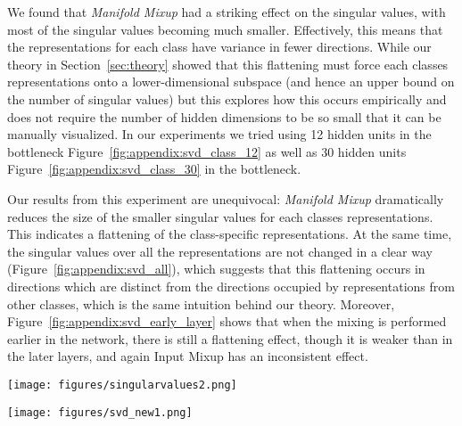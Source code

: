 \documentclass{article} \usepackage[preprint]{nips_2018}
\newcommand{\manifoldmixup}{\textit{Manifold Mixup}}
\begin{document}
{We found that \manifoldmixup{} had a striking effect on the singular values, with most of the singular values becoming much smaller.  Effectively, this means that the representations for each class have variance in fewer directions.  While our theory in Section~\ref{sec:theory} showed that this flattening must force each classes representations onto a lower-dimensional subspace (and hence an upper bound on the number of singular values) but this explores how this occurs empirically and does not require the number of hidden dimensions to be so small that it can be manually visualized.  In our experiments we tried using 12 hidden units in the bottleneck Figure~\ref{fig:appendix:svd_class_12} as well as 30 hidden units Figure~\ref{fig:appendix:svd_class_30} in the bottleneck.  

Our results from this experiment are unequivocal: \manifoldmixup{} dramatically reduces the size of the smaller singular values for each classes representations.  This indicates a flattening of the class-specific representations.  At the same time, the singular values over all the representations are not changed in a clear way (Figure~\ref{fig:appendix:svd_all}), which suggests that this flattening occurs in directions which are distinct from the directions occupied by representations from other classes, which is the same intuition behind our theory.  Moreover, Figure~\ref{fig:appendix:svd_early_layer} shows that when the mixing is performed earlier in the network, there is still a flattening effect, though it is weaker than in the later layers, and again Input Mixup has an inconsistent effect.  

\begin{figure*}
  \centering
  \texttt{[image: figures/singularvalues2.png]}
  \caption{SVD on the class-specific representations in a bottleneck layer with 12 units following 3 hidden layers.  For the first singular value, the value (averaged across the plots) is 50.08 for the baseline, 37.17 for Input Mixup, and 43.44 for \manifoldmixup{} (these are the values at x=0 which are cutoff).  We can see that the class-specific SVD leads to singular values which are dramatically more concentrated when using \manifoldmixup{} with Input Mixup not having a consistent effect.  }
  \label{fig:appendix:svd_class_12}
\end{figure*}

\begin{figure*}
  \centering
  \texttt{[image: figures/svd\_new1.png]}
  \caption{SVD on the class-specific representations in a bottleneck layer with 30 units following 3 hidden layers.  For the first singular value, the value (averaged across the plots) is 14.68 for the baseline, 12.49 for Input Mixup, and 14.43 for \manifoldmixup{} (these are the values at x=0 which are cutoff).  }
  \label{fig:appendix:svd_class_30}
\end{figure*}

}
\end{document}

